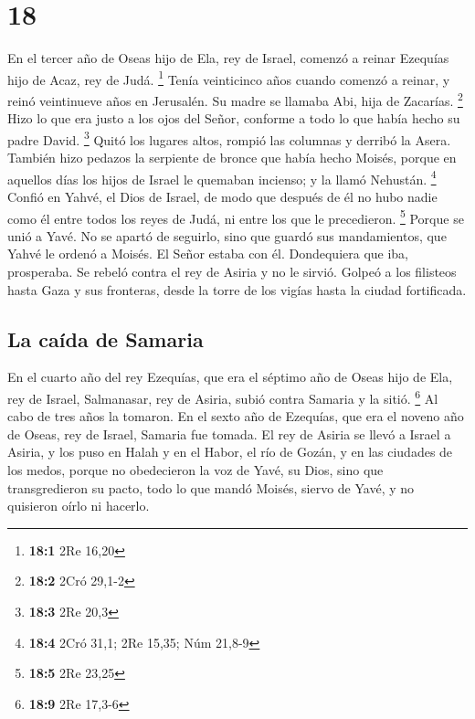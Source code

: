 \hypertarget{section-17}{%
\section{18}\label{section-17}}

 En el tercer año de Oseas hijo de Ela, rey de Israel,
comenzó a reinar Ezequías hijo de Acaz, rey de Judá. \footnote{\textbf{18:1}
  2Re 16,20}  Tenía veinticinco años cuando comenzó a
reinar, y reinó veintinueve años en Jerusalén. Su madre se llamaba Abi,
hija de Zacarías. \footnote{\textbf{18:2} 2Cró 29,1-2} 
Hizo lo que era justo a los ojos del Señor, conforme a todo lo que había
hecho su padre David. \footnote{\textbf{18:3} 2Re 20,3} 
Quitó los lugares altos, rompió las columnas y derribó la Asera. También
hizo pedazos la serpiente de bronce que había hecho Moisés, porque en
aquellos días los hijos de Israel le quemaban incienso; y la llamó
Nehustán. \footnote{\textbf{18:4} 2Cró 31,1; 2Re 15,35; Núm 21,8-9}
 Confió en Yahvé, el Dios de Israel, de modo que después
de él no hubo nadie como él entre todos los reyes de Judá, ni entre los
que le precedieron. \footnote{\textbf{18:5} 2Re 23,25} 
Porque se unió a Yavé. No se apartó de seguirlo, sino que guardó sus
mandamientos, que Yahvé le ordenó a Moisés.  El Señor
estaba con él. Dondequiera que iba, prosperaba. Se rebeló contra el rey
de Asiria y no le sirvió.  Golpeó a los filisteos hasta
Gaza y sus fronteras, desde la torre de los vigías hasta la ciudad
fortificada.

\hypertarget{la-cauxedda-de-samaria}{%
\subsection{La caída de Samaria}\label{la-cauxedda-de-samaria}}

 En el cuarto año del rey Ezequías, que era el séptimo año
de Oseas hijo de Ela, rey de Israel, Salmanasar, rey de Asiria, subió
contra Samaria y la sitió. \footnote{\textbf{18:9} 2Re 17,3-6}
 Al cabo de tres años la tomaron. En el sexto año de
Ezequías, que era el noveno año de Oseas, rey de Israel, Samaria fue
tomada.  El rey de Asiria se llevó a Israel a Asiria, y
los puso en Halah y en el Habor, el río de Gozán, y en las ciudades de
los medos,  porque no obedecieron la voz de Yavé, su
Dios, sino que transgredieron su pacto, todo lo que mandó Moisés, siervo
de Yavé, y no quisieron oírlo ni hacerlo.


